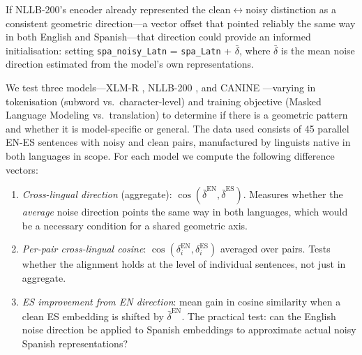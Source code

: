 \documentclass[11pt]{article}
\begin{document}
If NLLB-200's encoder already represented the
clean$\leftrightarrow$noisy distinction as a consistent geometric
direction---a vector offset that pointed reliably the same way in both
English and Spanish---that direction could provide an informed
initialisation: setting \texttt{spa\_noisy\_Latn} =
\texttt{spa\_Latn} + $\bar{\delta}$, where $\bar{\delta}$ is the
mean noise direction estimated from the model's own
representations.

We test three models---XLM-R \citep{conneau2020xlmr}, NLLB-200
\citep{nllb2022}, and CANINE \citep{clark2022canine}---varying in
tokenisation (subword vs.\ character-level) and training
objective (Masked Language Modeling vs.\ translation) to determine if
there is a geometric pattern and whether it is model-specific or general. The data used consists of  45 parallel EN-ES sentences with noisy and clean pairs, manufactured by linguists native in both languages in scope.
For each model we compute the following difference vectors:
\begin{enumerate}[noitemsep,topsep=2pt]
  \item \emph{Cross-lingual direction} (aggregate):
        $\cos(\bar{\delta}^{\text{EN}}, \bar{\delta}^{\text{ES}})$.
        Measures whether the \emph{average} noise direction points the same way
        in both languages, which would be a necessary condition for a shared geometric axis.
  \item \emph{Per-pair cross-lingual cosine}:
        $\cos(\delta_i^{\text{EN}}, \delta_i^{\text{ES}})$ averaged over pairs.
        Tests whether the alignment holds at the level of individual sentences,
        not just in aggregate.
  \item \emph{ES improvement from EN direction}: mean gain in cosine similarity
        when a clean ES embedding is shifted by $\bar{\delta}^{\text{EN}}$.
        The practical test: can the English noise direction be applied to Spanish
        embeddings to approximate actual noisy Spanish representations?
\end{enumerate}

\begin{table}[t]
  \centering
  \small
  \setlength{\tabcolsep}{2.5pt}
  \caption{Three-model comparison on 45 parallel EN--ES pairs.}
  \label{tab:embedding_analysis}
\end{table}
\end{document}
